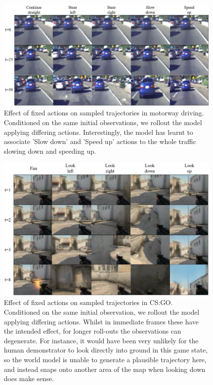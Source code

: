 \begin{figure}[h!]
    \begin{center}
    \includegraphics[width=0.99\columnwidth]{images/driving_action_02.png}
    \caption{Effect of fixed actions on sampled trajectories in motorway driving. Conditioned on the same initial observations, we rollout the model applying differing actions. Interestingly, the model has learnt to associate 'Slow down' and 'Speed up' actions to the whole traffic slowing down and speeding up.}
    \label{fig_driving_action}
    \end{center}
\end{figure}


\begin{figure}[t!]
    \begin{center}
    \includegraphics[width=0.9\columnwidth]{images/csgo_action_01.png}
    \caption{Effect of fixed actions on sampled trajectories in CS:GO. Conditioned on the same initial observation, we rollout the model applying differing actions. Whilst in immediate frames these have the intended effect, for longer roll-outs the observations can degenerate. For instance, it would have been very unlikely for the human demonstrator to look directly into ground in this game state, so the world model is unable to generate a plausible trajectory here, and instead snaps onto another area of the map when looking down does make sense.}
    \label{fig_csgo_action}
    \end{center}
\end{figure}
\clearpage
